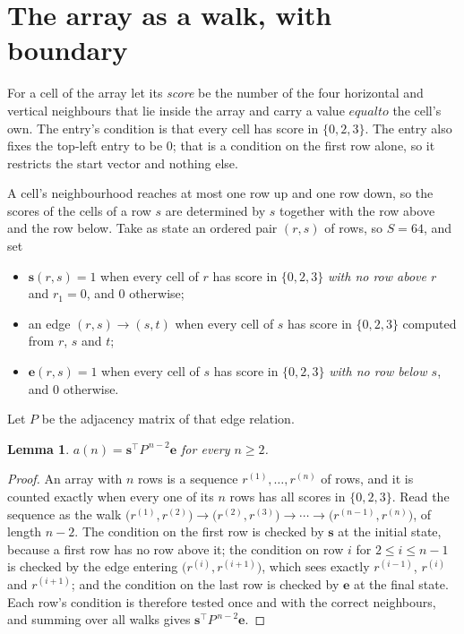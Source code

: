 \documentclass[11pt,a4paper]{article}
\theoremstyle{plain}
\newtheorem{lemma}[theorem]{Lemma}
\theoremstyle{definition}
\begin{document}
\section{The array as a walk, with boundary}

For a cell of the array let its \emph{score} be the number of the four horizontal and vertical neighbours that lie inside
the array and carry a value $equal to$ the cell's own. The entry's condition is that every cell
has score in $\{0,2,3\}$. The entry also fixes the top-left entry to be $0$; that is a condition on the first row alone, so it restricts the start vector and nothing else.

A cell's neighbourhood reaches at most one row up and one row down, so the scores of the
cells of a row $s$ are determined by $s$ together with the row above and the row below.
Take as state an ordered pair $(r,s)$ of rows, so $S=64$, and set
\begin{itemize}
\item $\mathbf{s}(r,s)=1$ when every cell of $r$ has score in $\{0,2,3\}$ \emph{with no row
above $r$} and $r_1=0$, and $0$ otherwise;
\item an edge $(r,s)\to(s,t)$ when every cell of $s$ has score in $\{0,2,3\}$ computed from
$r$, $s$ and $t$;
\item $\mathbf{e}(r,s)=1$ when every cell of $s$ has score in $\{0,2,3\}$ \emph{with no row
below $s$}, and $0$ otherwise.
\end{itemize}
Let $P$ be the adjacency matrix of that edge relation.

\begin{lemma}\label{lem:walk}
$a(n)=\mathbf{s}^{\!\top}P^{\,n-2}\mathbf{e}$ for every $n\ge2$.
\end{lemma}

\begin{proof}
An array with $n$ rows is a sequence $r^{(1)},\dots,r^{(n)}$ of rows, and it is counted
exactly when every one of its $n$ rows has all scores in $\{0,2,3\}$. Read the sequence as the
walk $\bigl(r^{(1)},r^{(2)}\bigr)\to\bigl(r^{(2)},r^{(3)}\bigr)\to\cdots\to
\bigl(r^{(n-1)},r^{(n)}\bigr)$, of length $n-2$. The condition on the first row is
checked by $\mathbf{s}$ at the initial state, because a first row has no row above it; the
condition on row $i$ for $2\le i\le n-1$ is checked by the edge entering
$\bigl(r^{(i)},r^{(i+1)}\bigr)$, which sees exactly $r^{(i-1)}$, $r^{(i)}$ and
$r^{(i+1)}$; and the condition on the last row is checked by $\mathbf{e}$ at the final
state. Each row's condition is therefore tested once and with the correct neighbours, and
summing over all walks gives $\mathbf{s}^{\!\top}P^{\,n-2}\mathbf{e}$.
\end{proof}
\end{document}
